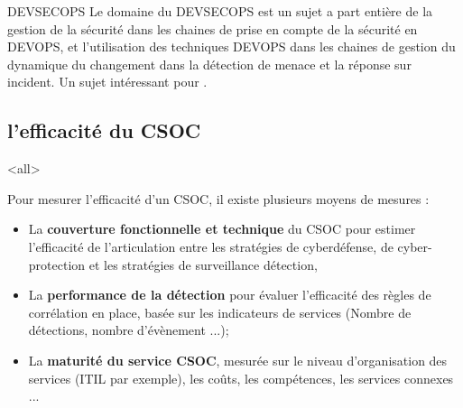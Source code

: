\begin{techworkbox}{DEVSECOPS}
Le domaine du DEVSECOPS est un sujet a part entière de la gestion de la sécurité dans les chaines de prise en compte de la sécurité  en DEVOPS, et l'utilisation des techniques DEVOPS dans les chaines de gestion du dynamique du changement dans la détection de menace et la réponse sur incident. Un sujet intéressant pour \fichetech.
\end{techworkbox}
 
 \subsection{l'efficacité du CSOC}
 
\mode<all>{
 {
 Pour mesurer l’efficacité d'un CSOC, il existe plusieurs moyens de mesures  :
 \begin{itemize}

  \item La \textbf{couverture fonctionnelle et technique }du CSOC pour estimer l'efficacité  de l'articulation entre les stratégies de cyberdéfense, de cyber-protection et les stratégies de surveillance détection, 
  \item La \textbf{performance de la détection } pour évaluer l’efficacité des règles de corrélation en place, basée sur les indicateurs de services (Nombre de détections, nombre d'évènement ...);
  \item La \textbf{maturité du service CSOC}, mesurée sur le niveau d'organisation des services (ITIL par exemple), les coûts, les compétences, les services connexes ...
\end{itemize}
}} %


